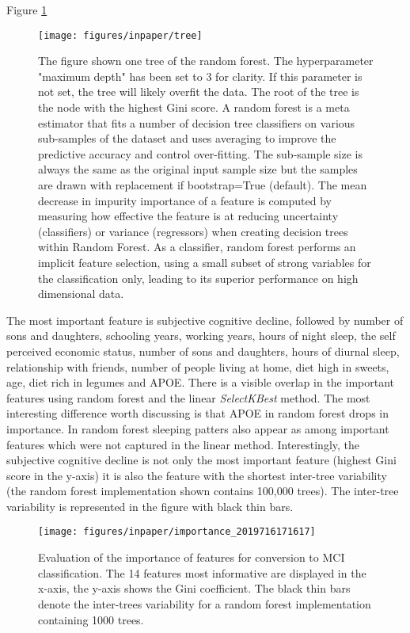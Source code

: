 \documentclass[preprint,12pt]{elsarticle}
\begin{document}

Figure \ref{fig:one_tree} 
\begin{figure}[!htb]
        \centering
        \texttt{[image: figures/inpaper/tree]}
        \caption{The figure shown one tree of the random forest. The hyperparameter "maximum depth" has been set to 3 for clarity. If this parameter is not set, the tree will likely overfit the data. The root of the tree is the node with the highest Gini score. A random forest is a meta estimator that fits a number of decision tree classifiers on various sub-samples of the dataset and uses averaging to improve the predictive accuracy and control over-fitting. The sub-sample size is always the same as the original input sample size but the samples are drawn with replacement if bootstrap=True (default). The mean decrease in impurity importance of a feature is computed by measuring how effective the feature is at reducing uncertainty (classifiers) or variance (regressors) when creating decision trees within Random Forest. As a classifier, random forest performs an implicit feature selection, using a small subset of strong variables for the classification only, leading to its superior performance on high dimensional data.} 
        \label{fig:one_tree}
\end{figure}
The most important feature is subjective cognitive decline, followed by number of sons and daughters, schooling years, working years, hours of night sleep, the self perceived economic status, number of sons and daughters, hours of diurnal sleep, relationship with friends, number of people living at home, diet high in sweets, age, diet rich in legumes and APOE.
There is a visible overlap in the important features using random forest and the linear \emph{SelectKBest} method. The most interesting difference worth discussing is that APOE in random forest drops in importance. In random forest sleeping patters also appear as among important features which were not captured in the linear method. 
Interestingly, the subjective cognitive decline is not only the most important feature (highest Gini score in the y-axis) it is also the feature with the shortest inter-tree variability (the random forest implementation shown contains 100,000 trees). The inter-tree variability is represented in the figure with black thin bars. 

\begin{figure}[!htb]
        \centering
        \texttt{[image: figures/inpaper/importance\_2019716171617]}
        \caption{Evaluation of the importance of features for conversion to MCI classification. The 14 features most informative are displayed in the x-axis, the y-axis shows the Gini coefficient. The black thin bars denote the inter-trees variability for a random forest implementation containing 1000 trees.} 
        \label{fig:RF_selectorgini}
\end{figure}
\end{document}
